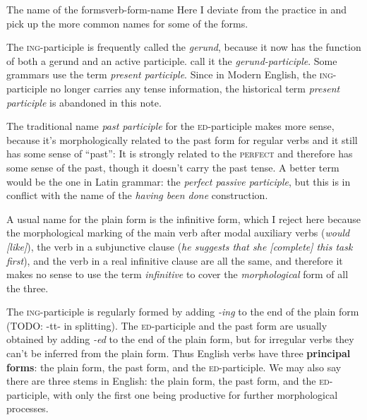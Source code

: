 \documentclass[UTF8, a4paper, oneside, scheme=plain]{ctexrep}
\newcommand*{\citechap}[1]{Ch~{#1}}
\newcommand*{\concept}[1]{\textbf{#1}}
\newcommand*{\term}[1]{\emph{#1}}
\newcommand{\corpus}[1]{\emph{#1}}
\newcommand{\category}[1]{\textsc{#1}}
\newcommand{\corpuscat}[1]{\textsc{#1}}
\begin{document}
\begin{infobox}{The name of the forms}{verb-form-name}
    Here I deviate from the practice in \citep[\citechap{3}]{cgel} 
    and pick up the more common names for some of the forms. 

    The \corpuscat{ing}-participle is frequently called the \term{gerund},
    because it now has the function of both a gerund and an active participle.
    \citet{cgel} call it the \term{gerund-participle}.
    Some grammars use the term \term{present participle}.
    Since in Modern English,
    the \corpuscat{ing}-participle no longer carries any tense information,
    the historical term \term{present participle} is abandoned in this note.

    The traditional name \term{past participle} for the \corpuscat{ed}-participle makes more sense,
    because it's morphologically related to the past form for regular verbs 
    and it still has some sense of ``past'':
    It is strongly related to the \category{perfect} and therefore has some sense of the past,
    though it doesn't carry the past tense.
    A better term would be the one in Latin grammar: the \term{perfect passive participle},
    but this is in conflict with the name of the \corpus{having been done} construction.

    A usual name for the plain form is the infinitive form,
    which I reject here because the morphological marking of 
    the main verb after modal auxiliary verbs  
    (\corpus{would [like]}),
    the verb in a subjunctive clause 
    (\corpus{he suggests that she [complete] this task first}),
    and the verb in a real infinitive clause are all the same,
    and therefore it makes no sense to use the term \term{infinitive} 
    to cover the \emph{morphological} form of all the three.
\end{infobox}

The \corpuscat{ing}-participle is regularly formed by adding \corpus{-ing} to the end of the plain form
(TODO: -tt- in splitting).
The \corpuscat{ed}-participle and the past form are usually obtained 
by adding \corpus{-ed} to the end of the plain form,
but for irregular verbs they can't be inferred from the plain form.
Thus English verbs have three \concept{principal forms}:
the plain form, the past form, and the \corpuscat{ed}-participle.
We may also say there are three stems in English:
the plain form, the past form, and the \corpuscat{ed}-participle,
with only the first one being productive for further morphological processes.
\end{document}
